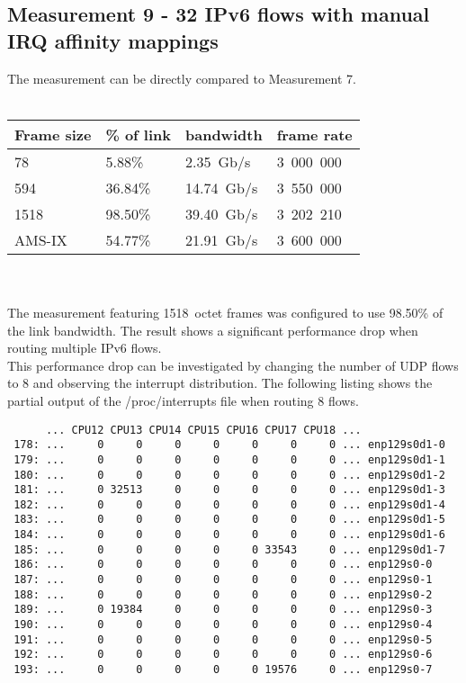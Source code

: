 
\subsection{Measurement 9 - 32 IPv6 flows with manual IRQ affinity mappings}
The measurement can be directly compared to Measurement 7.
\\
\\
\begin{tabular}{ | l | l | l | l | }
\hline
Frame size & \% of link & bandwidth & frame rate \\
\hline
78     &  5.88\% &  2.35~Gb/s & 3~000~000 \\
594    & 36.84\% & 14.74~Gb/s & 3~550~000 \\
1518   & 98.50\% & 39.40~Gb/s & 3~202~210 \\
AMS-IX & 54.77\% & 21.91~Gb/s & 3~600~000 \\
\hline
\end{tabular}
\\
\\
The measurement featuring 1518~octet frames was configured to use 98.50\% of the link bandwidth.
The result shows a significant performance drop when routing multiple IPv6 flows.
\\
This performance drop can be investigated by changing the number of UDP flows to 8
and observing the interrupt distribution.
The following listing shows the partial output of the /proc/interrupts file when routing 8 flows.
\begin{lstlisting}
      ... CPU12 CPU13 CPU14 CPU15 CPU16 CPU17 CPU18 ...
 178: ...     0     0     0     0     0     0     0 ... enp129s0d1-0
 179: ...     0     0     0     0     0     0     0 ... enp129s0d1-1
 180: ...     0     0     0     0     0     0     0 ... enp129s0d1-2
 181: ...     0 32513     0     0     0     0     0 ... enp129s0d1-3
 182: ...     0     0     0     0     0     0     0 ... enp129s0d1-4
 183: ...     0     0     0     0     0     0     0 ... enp129s0d1-5
 184: ...     0     0     0     0     0     0     0 ... enp129s0d1-6
 185: ...     0     0     0     0     0 33543     0 ... enp129s0d1-7
 186: ...     0     0     0     0     0     0     0 ... enp129s0-0
 187: ...     0     0     0     0     0     0     0 ... enp129s0-1
 188: ...     0     0     0     0     0     0     0 ... enp129s0-2
 189: ...     0 19384     0     0     0     0     0 ... enp129s0-3
 190: ...     0     0     0     0     0     0     0 ... enp129s0-4
 191: ...     0     0     0     0     0     0     0 ... enp129s0-5
 192: ...     0     0     0     0     0     0     0 ... enp129s0-6
 193: ...     0     0     0     0     0 19576     0 ... enp129s0-7
\end{lstlisting}
